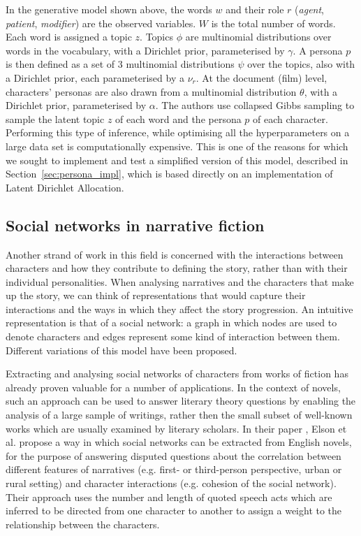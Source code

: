 \documentclass[bsc,frontabs,singlespacing,parskip, twoside]{infthesis}
\begin{document}
In the generative model shown above, the words $w$ and their role $r$ (\textit{agent}, \textit{patient}, \textit{modifier}) are the observed variables. $W$ is the total number of words. Each word is assigned a topic $z$. Topics $\phi$ are multinomial distributions over words in the vocabulary, with a Dirichlet prior, parameterised by $\gamma$. A persona $p$ is then defined as a set of 3 multinomial distributions $\psi$ over the topics, also with a Dirichlet prior, each parameterised by a $\nu_r$. At the document (film) level, characters' personas are also drawn from a multinomial distribution $\theta$, with a Dirichlet prior, parameterised by $\alpha$. The authors use collapsed Gibbs sampling \cite{griffiths2004finding} to sample the latent topic $z$ of each word and the persona $p$ of each character. Performing this type of inference, while optimising all the hyperparameters on a large data set is computationally expensive. This is one of the reasons for which we sought to implement and test a simplified version of this model, described in Section~\ref{sec:persona_impl}, which is based directly on an implementation of Latent Dirichlet Allocation.

\subsection{Social networks in narrative fiction}
Another strand of work in this field is concerned with the interactions between characters and how they contribute to defining the story, rather than with their individual personalities. When analysing narratives and the characters that make up the story, we can think of representations that would capture their interactions and the ways in which they affect the story progression. An intuitive representation is that of a social network: a graph in which nodes are used to denote characters and edges represent some kind of interaction between them. Different variations of this model have been proposed.

Extracting and analysing social networks of characters from works of fiction has already proven valuable for a number of applications. In the context of novels, such an approach can be used to answer literary theory questions by enabling the analysis of a large sample of writings, rather then the small subset of well-known works which are usually examined by literary scholars. In their paper \cite{Elson2010}, Elson et al. propose a way in which social networks can be extracted from English novels, for the purpose of answering disputed questions about the correlation between different features of narratives (e.g. first- or third-person perspective, urban or rural setting) and character interactions (e.g. cohesion of the social network). Their approach uses the number and length of quoted speech acts which are inferred to be directed from one character to another to assign a weight to the relationship between the characters.
\end{document}
